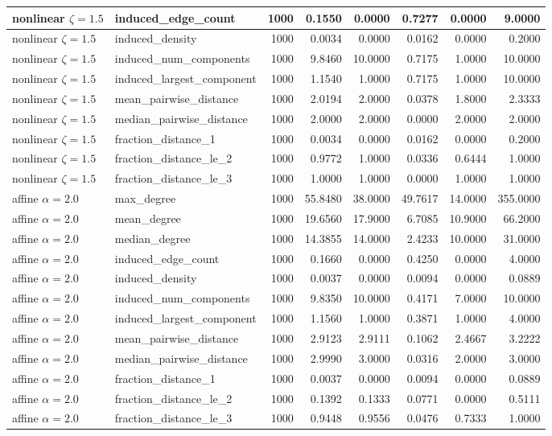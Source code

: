 \documentclass[10pt,letterpaper]{article}
\begin{document}
\begin{longtable}{|l|l|r|r|r|r|r|r|}
nonlinear $\zeta=1.5$ & induced\_edge\_count & 1000 & 0.1550 & 0.0000 & 0.7277 & 0.0000 & 9.0000 \\\hline
nonlinear $\zeta=1.5$ & induced\_density & 1000 & 0.0034 & 0.0000 & 0.0162 & 0.0000 & 0.2000 \\\hline
nonlinear $\zeta=1.5$ & induced\_num\_components & 1000 & 9.8460 & 10.0000 & 0.7175 & 1.0000 & 10.0000 \\\hline
nonlinear $\zeta=1.5$ & induced\_largest\_component & 1000 & 1.1540 & 1.0000 & 0.7175 & 1.0000 & 10.0000 \\\hline
nonlinear $\zeta=1.5$ & mean\_pairwise\_distance & 1000 & 2.0194 & 2.0000 & 0.0378 & 1.8000 & 2.3333 \\\hline
nonlinear $\zeta=1.5$ & median\_pairwise\_distance & 1000 & 2.0000 & 2.0000 & 0.0000 & 2.0000 & 2.0000 \\\hline
nonlinear $\zeta=1.5$ & fraction\_distance\_1 & 1000 & 0.0034 & 0.0000 & 0.0162 & 0.0000 & 0.2000 \\\hline
nonlinear $\zeta=1.5$ & fraction\_distance\_le\_2 & 1000 & 0.9772 & 1.0000 & 0.0336 & 0.6444 & 1.0000 \\\hline
nonlinear $\zeta=1.5$ & fraction\_distance\_le\_3 & 1000 & 1.0000 & 1.0000 & 0.0000 & 1.0000 & 1.0000 \\\hline
\hline
affine $\alpha=2.0$ & max\_degree & 1000 & 55.8480 & 38.0000 & 49.7617 & 14.0000 & 355.0000 \\\hline
affine $\alpha=2.0$ & mean\_degree & 1000 & 19.6560 & 17.9000 & 6.7085 & 10.9000 & 66.2000 \\\hline
affine $\alpha=2.0$ & median\_degree & 1000 & 14.3855 & 14.0000 & 2.4233 & 10.0000 & 31.0000 \\\hline
affine $\alpha=2.0$ & induced\_edge\_count & 1000 & 0.1660 & 0.0000 & 0.4250 & 0.0000 & 4.0000 \\\hline
affine $\alpha=2.0$ & induced\_density & 1000 & 0.0037 & 0.0000 & 0.0094 & 0.0000 & 0.0889 \\\hline
affine $\alpha=2.0$ & induced\_num\_components & 1000 & 9.8350 & 10.0000 & 0.4171 & 7.0000 & 10.0000 \\\hline
affine $\alpha=2.0$ & induced\_largest\_component & 1000 & 1.1560 & 1.0000 & 0.3871 & 1.0000 & 4.0000 \\\hline
affine $\alpha=2.0$ & mean\_pairwise\_distance & 1000 & 2.9123 & 2.9111 & 0.1062 & 2.4667 & 3.2222 \\\hline
affine $\alpha=2.0$ & median\_pairwise\_distance & 1000 & 2.9990 & 3.0000 & 0.0316 & 2.0000 & 3.0000 \\\hline
affine $\alpha=2.0$ & fraction\_distance\_1 & 1000 & 0.0037 & 0.0000 & 0.0094 & 0.0000 & 0.0889 \\\hline
affine $\alpha=2.0$ & fraction\_distance\_le\_2 & 1000 & 0.1392 & 0.1333 & 0.0771 & 0.0000 & 0.5111 \\\hline
affine $\alpha=2.0$ & fraction\_distance\_le\_3 & 1000 & 0.9448 & 0.9556 & 0.0476 & 0.7333 & 1.0000 \\\hline
\hline
\hline\end{longtable}\endgroup
\end{document}
